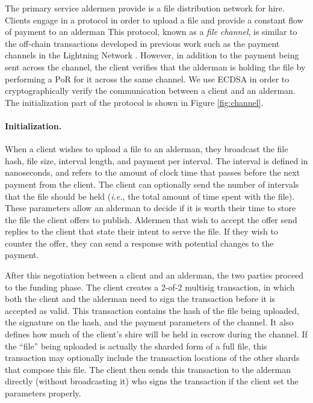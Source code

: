 \documentclass{article}
\begin{document}
The primary service aldermen provide is a file distribution network for hire.
Clients engage in a protocol in order to upload a file and provide a constant
flow of payment to an alderman This
protocol, known as a \emph{file channel}, is similar to the off-chain
transactions developed in previous work such as the payment channels in the
Lightning Network \cite{lightning}. However, in addition to the payment being
sent across the channel, the client verifies that the alderman is holding the
file by performing a PoR for it across the same channel. We use ECDSA in order
to cryptographically verify the communication between a client and an alderman.
The initialization part of the protocol is shown in Figure \ref{fig:channel}.

\paragraph{Initialization.} When a client wishes to upload a file to an
alderman, they broadcast the file hash, file size, interval length, and payment
per interval. The interval is defined in nanoseconds, and refers to the amount
of clock time that passes before the next payment from the client. The client
can optionally send the number of intervals that the file should be held
(\emph{i.e.}, the total amount of time spent with the file). These parameters
allow an alderman to decide if it is worth their time to store the file the
client offers to publish. Aldermen that wish to accept the offer send replies to
the client that state their intent to serve the file. If they wish to counter
the offer, they can send a response with potential changes to the payment.

After this negotiation between a client and an alderman, the two parties proceed
to the funding phase. The client creates a 2-of-2 multisig transaction, in which
both the client and the alderman need to sign the transaction before it is
accepted as valid. This transaction contains the hash of the file being
uploaded, the signature on the hash, and the payment parameters of the channel.
It also defines how much of the client's shire will be held in escrow during the
channel. If the ``file'' being uploaded is actually the sharded form of a full
file, this transaction may optionally include the transaction locations of the
other shards that compose this file. The client then sends this transaction to
the alderman directly (without broadcasting it) who signs the transaction if the
client set the parameters properly.
\end{document}
